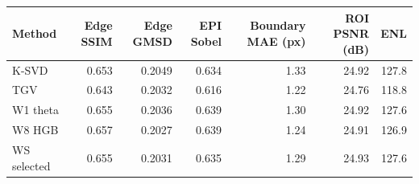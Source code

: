 \begin{tabular}{lrrrrrr}
\toprule
Method & Edge SSIM & Edge GMSD & EPI Sobel & Boundary MAE (px) & ROI PSNR (dB) & ENL \\
\midrule
K-SVD & 0.653 & 0.2049 & 0.634 & 1.33 & 24.92 & 127.8 \\
TGV & 0.643 & 0.2032 & 0.616 & 1.22 & 24.76 & 118.8 \\
W1 theta & 0.655 & 0.2036 & 0.639 & 1.30 & 24.92 & 127.6 \\
W8 HGB & 0.657 & 0.2027 & 0.639 & 1.24 & 24.91 & 126.9 \\
WS selected & 0.655 & 0.2031 & 0.635 & 1.29 & 24.93 & 127.6 \\
\bottomrule
\end{tabular}
